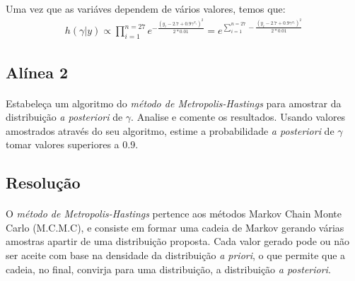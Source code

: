 \documentclass{article}
\begin{document}
	Uma vez que as variáves dependem de vários valores, temos que:
					\begin{align*}
						h(\gamma | y) \propto \prod_{i=1}^{n=27}e^{-\frac{(y_{i}-2.7+0.9\gamma^{x_{i}})^2}{2*0.01}} = e^{\sum_{i=1}^{n=27}-\frac{(y_{i}-2.7+0.9\gamma^{x_{i}})^2}{2*0.01}}
					\end{align*}


		\subsection*{Alínea 2}
			\paragraph{}
				Estabeleça um algoritmo do \textit{método de Metropolis-Hastings} para amostrar da distribuição \textit{a posteriori} de $\gamma$. Analise e comente os resultados. Usando valores amostrados através do seu algoritmo, estime a probabilidade \textit{a posteriori} de $\gamma$ tomar valores superiores a 0.9.

			\subsection*{Resolução}
				\paragraph{}
					 O \textit{método de Metropolis-Hastings} pertence aos métodos Markov Chain Monte Carlo (M.C.M.C), e consiste em formar uma cadeia de Markov gerando várias amostras apartir de uma distribuição proposta. Cada valor gerado pode ou não ser aceite com base na densidade da distribuição \textit{a priori}, o que permite que a cadeia, no final, convirja para uma distribuição, a distribuição \textit{a posteriori}. 
		
\end{document}
